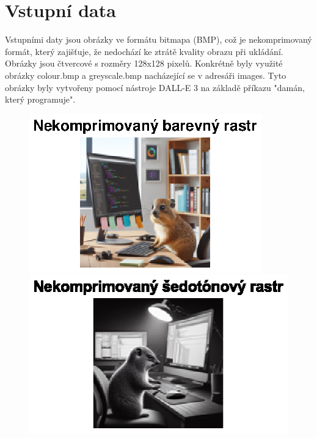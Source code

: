 \newpage
\section{Vstupní data}

Vstupními daty jsou obrázky ve formátu bitmapa (BMP), což je nekomprimovaný formát, který zajišťuje, že nedochází ke ztrátě kvality obrazu při ukládání. Obrázky jsou čtvercové s rozměry 128x128 pixelů. Konkrétně byly využité obrázky colour.bmp a greyscale.bmp nacházející se v adresáři images. Tyto obrázky byly vytvořeny pomocí nástroje DALL-E 3 na základě příkazu "damán, který programuje".

\begin{figure}[H]
    \centering
    \begin{minipage}[b]{0.45\textwidth}
        \centering
        \includegraphics[width=\textwidth]{images/color.eps}
    \end{minipage}
    \hfill
    \begin{minipage}[b]{0.45\textwidth}
        \centering
        \includegraphics[width=\textwidth]{images/grey.eps}
    \end{minipage}
\end{figure}